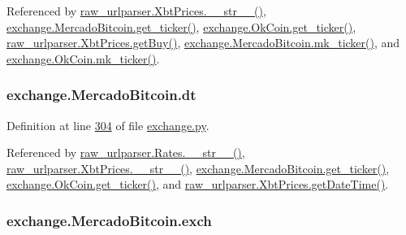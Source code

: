 Referenced by \hyperlink{raw__urlparser_8py_source_l00074}{raw\+\_\+urlparser.\+Xbt\+Prices.\+\_\+\+\_\+str\+\_\+\+\_\+()}, \hyperlink{exchange_8py_source_l00306}{exchange.\+Mercado\+Bitcoin.\+get\+\_\+ticker()}, \hyperlink{exchange_8py_source_l00371}{exchange.\+Ok\+Coin.\+get\+\_\+ticker()}, \hyperlink{raw__urlparser_8py_source_l00062}{raw\+\_\+urlparser.\+Xbt\+Prices.\+get\+Buy()}, \hyperlink{exchange_8py_source_l00320}{exchange.\+Mercado\+Bitcoin.\+mk\+\_\+ticker()}, and \hyperlink{exchange_8py_source_l00385}{exchange.\+Ok\+Coin.\+mk\+\_\+ticker()}.

\subsubsection[{\texorpdfstring{dt}{dt}}]{\setlength{\rightskip}{0pt plus 5cm}exchange.\+Mercado\+Bitcoin.\+dt}\hypertarget{classexchange_1_1_mercado_bitcoin_aeee983ba4f72223a11fb914d22902c56}{}\label{classexchange_1_1_mercado_bitcoin_aeee983ba4f72223a11fb914d22902c56}


Definition at line \hyperlink{exchange_8py_source_l00304}{304} of file \hyperlink{exchange_8py_source}{exchange.\+py}.



Referenced by \hyperlink{raw__urlparser_8py_source_l00038}{raw\+\_\+urlparser.\+Rates.\+\_\+\+\_\+str\+\_\+\+\_\+()}, \hyperlink{raw__urlparser_8py_source_l00074}{raw\+\_\+urlparser.\+Xbt\+Prices.\+\_\+\+\_\+str\+\_\+\+\_\+()}, \hyperlink{exchange_8py_source_l00306}{exchange.\+Mercado\+Bitcoin.\+get\+\_\+ticker()}, \hyperlink{exchange_8py_source_l00371}{exchange.\+Ok\+Coin.\+get\+\_\+ticker()}, and \hyperlink{raw__urlparser_8py_source_l00059}{raw\+\_\+urlparser.\+Xbt\+Prices.\+get\+Date\+Time()}.

\subsubsection[{\texorpdfstring{exch}{exch}}]{\setlength{\rightskip}{0pt plus 5cm}exchange.\+Mercado\+Bitcoin.\+exch}\hypertarget{classexchange_1_1_mercado_bitcoin_a68701550b43374441e52ea2082d88400}{}\label{classexchange_1_1_mercado_bitcoin_a68701550b43374441e52ea2082d88400}


